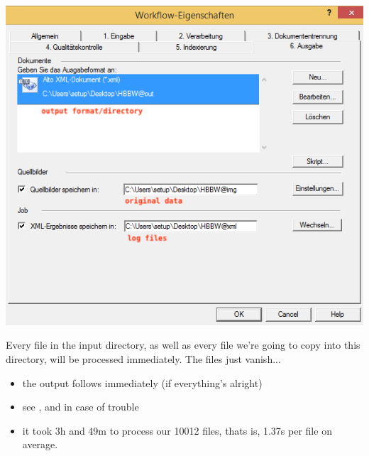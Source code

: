 \begin{center}
\includegraphics[scale=0.6]{6_ausgabe.png}
\end{center}

Every file in the input directory, as well as every file we're going to copy into this directory, will be processed immediately. The files just vanish...

\begin{itemize}
\item the output follows immediately (if everything's alright)
\item see ,  and  in case of trouble
\item it took 3h and 49m to process our 10012 files, thats is, 1.37s per file on average.
\end{itemize}




